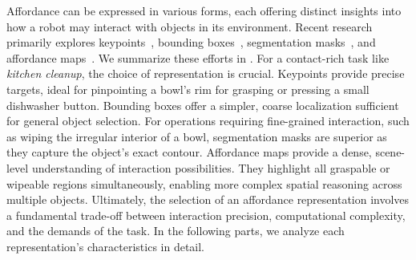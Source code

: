 \documentclass[10pt, a4paper, logo, copyright]{googledeepmind} %
\begin{document}
Affordance can be expressed in various forms, each offering distinct insights into how a robot may interact with objects in its environment. Recent research primarily explores keypoints~\cite{sundaresankite, huangrekep, kuangram}, bounding boxes~\cite{wake2024gpt, huanga3vlm, zhong2025dexgraspvla}, segmentation masks~\cite{liu2025robodexvlm, qi2025sofar}, and affordance maps~\cite{10656630, huang2023voxposer, xu2024manifoundation}. We summarize these efforts in . For a contact-rich task like \textit{kitchen cleanup}, the choice of representation is crucial. Keypoints provide precise targets, ideal for pinpointing a bowl's rim for grasping or pressing a small dishwasher button. Bounding boxes offer a simpler, coarse localization sufficient for general object selection. For operations requiring fine-grained interaction, such as wiping the irregular interior of a bowl, segmentation masks are superior as they capture the object's exact contour. Affordance maps provide a dense, scene-level understanding of interaction possibilities. They highlight all graspable or wipeable regions simultaneously, enabling more complex spatial reasoning across multiple objects. Ultimately, the selection of an affordance representation involves a fundamental trade-off between interaction precision, computational complexity, and the demands of the task. In the following parts, we analyze each representation’s characteristics in detail.


\end{document}
